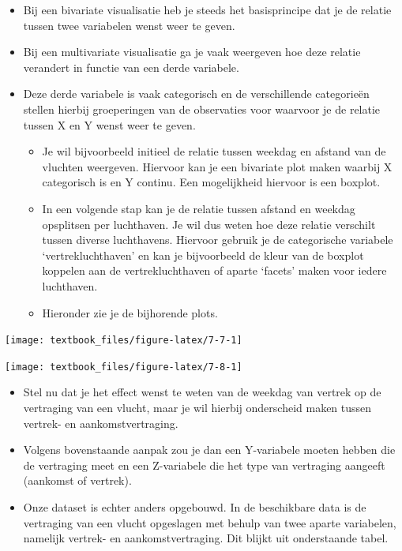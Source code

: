 \documentclass[]{tufte-book}
\providecommand{\tightlist}{%
  \setlength{\itemsep}{0pt}\setlength{\parskip}{0pt}}
\begin{document}
\begin{itemize}
\tightlist
\item
  Bij een bivariate visualisatie heb je steeds het basisprincipe dat je de relatie tussen twee variabelen wenst weer te geven.
\item
  Bij een multivariate visualisatie ga je vaak weergeven hoe deze relatie verandert in functie van een derde variabele.
\item
  Deze derde variabele is vaak categorisch en de verschillende categorieën stellen hierbij groeperingen van de observaties voor waarvoor je de relatie tussen X en Y wenst weer te geven.

  \begin{itemize}
  \tightlist
  \item
    Je wil bijvoorbeeld initieel de relatie tussen weekdag en afstand van de vluchten weergeven. Hiervoor kan je een bivariate plot maken waarbij X categorisch is en Y continu. Een mogelijkheid hiervoor is een boxplot.
  \item
    In een volgende stap kan je de relatie tussen afstand en weekdag opsplitsen per luchthaven. Je wil dus weten hoe deze relatie verschilt tussen diverse luchthavens. Hiervoor gebruik je de categorische variabele `vertrekluchthaven' en kan je bijvoorbeeld de kleur van de boxplot koppelen aan de vertrekluchthaven of aparte `facets' maken voor iedere luchthaven.
  \item
    Hieronder zie je de bijhorende plots.
  \end{itemize}
\end{itemize}

\texttt{[image: textbook\_files/figure-latex/7-7-1]}

\texttt{[image: textbook\_files/figure-latex/7-8-1]}

\begin{itemize}
\tightlist
\item
  Stel nu dat je het effect wenst te weten van de weekdag van vertrek op de vertraging van een vlucht, maar je wil hierbij onderscheid maken tussen vertrek- en aankomstvertraging.
\item
  Volgens bovenstaande aanpak zou je dan een Y-variabele moeten hebben die de vertraging meet en een Z-variabele die het type van vertraging aangeeft (aankomst of vertrek).
\item
  Onze dataset is echter anders opgebouwd. In de beschikbare data is de vertraging van een vlucht opgeslagen met behulp van twee aparte variabelen, namelijk vertrek- en aankomstvertraging. Dit blijkt uit onderstaande tabel.
\end{itemize}
\end{document}
